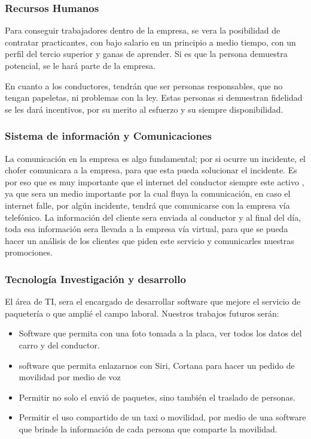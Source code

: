 \subsubsection{Recursos Humanos}
Para conseguir trabajadores dentro de la empresa, se vera la posibilidad de contratar practicantes, con bajo salario en un principio a medio tiempo, con un perfil del tercio superior y ganas de aprender. Si es que la persona demuestra potencial, se le hará parte de la empresa.

En cuanto a los conductores, tendrán que ser personas responsables, que no tengan papeletas, ni problemas con la ley. Estas personas si demuestran fidelidad se les dará incentivos, por su merito al esfuerzo y su siempre disponibilidad.

\subsubsection{Sistema de información y Comunicaciones}
La comunicación en la empresa es algo fundamental; por si ocurre un incidente, el chofer comunicara a la empresa, para que esta pueda solucionar el incidente. Es por eso que es muy importante que el internet del conductor siempre este activo , ya que sera un medio importante por la cual fluya la comunicación, en caso el internet falle, por algún incidente, tendrá que comunicarse con la empresa vía telefónico.
La información del cliente sera enviada al conductor y al final del día, toda esa información sera llevada a la empresa vía virtual, para que se pueda hacer un análisis de los clientes que piden este servicio y comunicarles nuestras promociones.


\subsubsection{Tecnología Investigación y desarrollo}
El área de TI, sera el encargado de desarrollar software que mejore el servicio de paquetería o que amplié el campo laboral. Nuestros trabajos futuros serán:
\begin{itemize}
    \item Software que permita con una foto tomada a la placa, ver todos los datos del carro y del conductor.
    \item software que permita enlazarnos con Siri, Cortana para hacer un pedido de movilidad por medio de voz
    \item Permitir no solo el envió de paquetes, sino también el traslado de personas.
    \item Permitir el uso compartido de un taxi o movilidad, por medio de una software que brinde la información de cada persona que comparte la movilidad.
\end{itemize}

